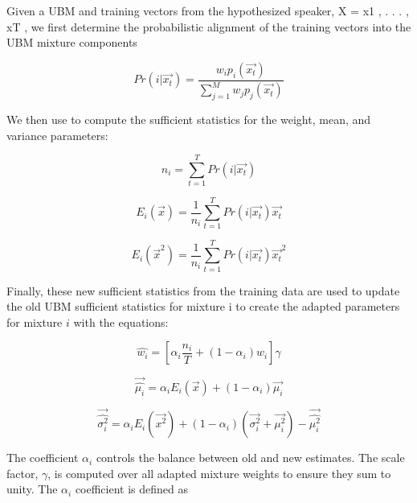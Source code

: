 \documentclass[a4paper,twocolumn]{article}
\begin{document}
Given a UBM and training vectors from the hypothesized speaker, X = {x1 , . . . , xT }, we first determine the probabilistic alignment of the training vectors into the UBM mixture components

\begin{equation}
    \label{eq:prob_alignment}
    Pr(i|\vec{x_t}) = \frac{w_i p_i(\vec{x_t})}{\sum_{j=1}^M w_j p_j(\vec{x_t})}
\end{equation}

\noindent We then use  to compute the sufficient statistics for the weight, mean, and variance parameters:

\begin{equation}
    \label{eq:sum_prob_alignment}
    n_i = \sum_{t=1}^TPr(i|\vec{x_t})
\end{equation}

\begin{equation}
    \label{eq:mean_new}
    E_i(\vec{x}) = \frac{1}{n_i} \sum_{t=1}^T Pr(i|\vec{x_t})\vec{x_t}
\end{equation}

\begin{equation}
    \label{eq:var_new}
    E_i(\vec{x}^2) = \frac{1}{n_i} \sum_{t=1}^T Pr(i|\vec{x_t})\vec{x_t}^2
\end{equation}

Finally, these new sufficient statistics from the training data are used to update the old UBM sufficient statistics for mixture i to create the adapted parameters for mixture $i$ with the equations:

\begin{equation}
    \label{eq:weight_adapt}
    \hat{w_i} = [\alpha_i \frac{n_i}{T} + (1 - \alpha_i)w_i]\gamma
\end{equation}

\begin{equation}
    \label{eq:mean_adapt}
    \vec{\hat{\mu_i}} = \alpha_i E_i(\vec{x}) + (1 - \alpha_i)\vec{\mu_i}
\end{equation}

\begin{equation}
    \label{eq:var_adapt}
    \vec{\hat{\sigma_i^2}} = \alpha_i E_i(\vec{x^2}) + (1 - \alpha_i)(\vec{\sigma_i^2} + \vec{\mu_i^2}) - \vec{\hat{\mu_i^2}}
\end{equation}

The coefficient $\alpha_i$ controls the balance between old and new estimates. The scale factor, $\gamma$, is computed over all adapted mixture weights to ensure they sum to unity. The $\alpha_i$ coefficient is defined as
\end{document}
